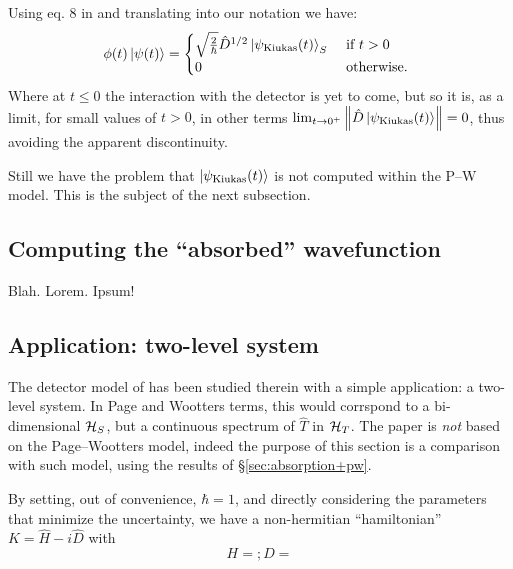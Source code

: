 Using eq. 8 in \cite{RuschhauptAbsorption} and translating into our notation we have:
\begin{equation}
  \phi(t)\ket{\psi(t)} =
  \begin{cases}
    \sqrt{\frac{2}{\hbar}} \hat{D}^{1/2} \ket{\psi_{\text{Kiukas}}(t)}_S &\text{ if } t > 0 \\
    0 &\text{ otherwise. }
  \end{cases}
\end{equation}
Where at $t \le 0$ the interaction with the detector is yet to come,
but so it is, as a limit, for small values of $t>0$,
in other terms
$\lim_{t \to 0^{+}} \norm{\hat{D} \ket{\psi_{\text{Kiukas}}(t)}} = 0$, thus avoiding the apparent discontinuity.

Still we have the problem that $\ket{\psi_{\text{Kiukas}}(t)}$ is not computed within the
P--W model. This is the subject of the next subsection.

\subsection{Computing the ``absorbed'' wavefunction}

Blah. Lorem. Ipsum!

\subsection{Application: two-level system}

The detector model of \cite{RuschhauptAbsorption} has been studied therein
with a simple application: a two-level system. In Page and Wootters terms,
this would corrspond to a bi-dimensional $\mathcal{H}_S$, but a continuous
spectrum of $\hat{T}$ in $\mathcal{H}_T$. The paper is \emph{not} based on
the Page--Wootters model, indeed the purpose of this section is a comparison
with such model, using the results of \S \ref{sec:absorption+pw}.

By setting, out of convenience, $\hbar = 1$, and directly considering the parameters
that minimize the uncertainty, we have a non-hermitian ``hamiltonian''
$K = \hat{H} - i\hat{D}$ with
\begin{equation}
  H = ; D =
\end{equation}